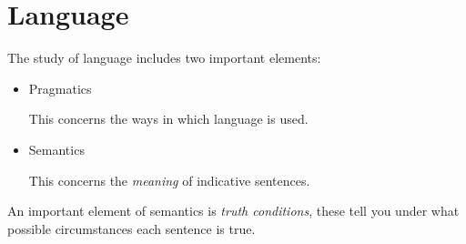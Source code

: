 \documentclass[10pt,titlepage]{article}
\begin{document}
{\section{Language}

The study of language includes two important elements:

\begin{itemize}
\item Pragmatics

  This concerns the ways in which language is used.
  
\item Semantics

  This concerns the \emph{meaning} of indicative sentences.
  
\end{itemize}

An important element of semantics is \emph{truth conditions}, these tell you under what possible circumstances each sentence is true.

}%
\end{document}
